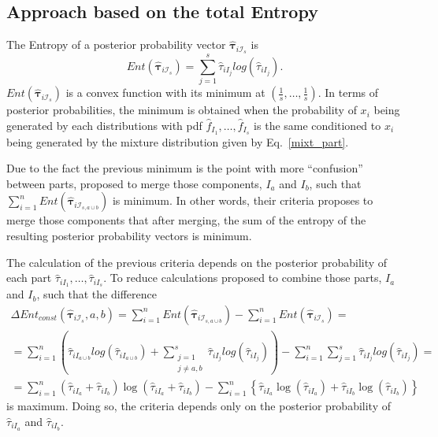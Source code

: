\documentclass[10pt, a4paper]{article}
\newcommand{\m}[1]{\boldsymbol{#1}}
\begin{document}
\subsection{Approach based on the total Entropy}

The Entropy of a posterior probability vector $\hat{\m \tau}_{i \mathcal{I}_s}$ is
\[
Ent( \hat{\m \tau}_{i \mathcal{I}_s} ) = \sum_{j=1}^s \hat{\tau}_{i I_j}  log(\hat{\tau}_{i I_j} ).
\]
$Ent( \hat{\m \tau}_{i \mathcal{I}_s} )$ is a convex function with its minimum at $(\frac{1}{s},\dots,\frac{1}{s})$. In terms of posterior probabilities, the minimum is obtained when the probability of $x_i$ being generated by each distributions with pdf $\hat{f}_{I_1}, \dots, \hat{f}_{I_s}$ is the same conditioned to $x_i$ being generated by the mixture distribution given by Eq.~\ref{mixt_part}.

Due to the fact the previous minimum is the point with more ``confusion'' between parts, \cite{baudry2010combining} proposed to merge those components, $I_a$ and $I_b$, such that $\sum_{i=1}^n Ent( \hat{\m \tau}_{i \mathcal{I}_{s, a \cup b}} )$ is minimum. In other words, their criteria proposes to merge those components that after merging, the sum of the entropy of the resulting posterior probability vectors is minimum.

The calculation of the previous criteria depends on the posterior probability of each part $\hat{\tau}_{iI_1}, \dots,\hat{\tau}_{iI_s}$. To reduce calculations \cite{baudry2010combining} proposed to combine those parts, $I_a$ and $I_b$, such that the difference 
\begin{multline*}
\Delta Ent_{const}(\hat{\m \tau}_{i \mathcal{I}_s}, a, b) = \sum_{i=1}^n Ent( \hat{\m \tau}_{i \mathcal{I}_{s, a \cup b}}) - \sum_{i=1}^n Ent( \hat{\m \tau}_{i \mathcal{I}_s}) =  \\ = \sum_{i=1}^n  \left( \hat{\tau}_{i I_{a\cup b}}  log(\hat{\tau}_{i I_{a\cup b}} ) +  \sum_{\substack{j=1 \\
                                                            j \neq a, b}}^s \hat{\tau}_{i I_j}  log(\hat{\tau}_{i I_j} ) \right)  - \sum_{i=1}^n \sum_{j=1}^s \hat{\tau}_{i I_j}  log(\hat{\tau}_{i I_j} ) = \\  =   \sum_{i=1}^n  (\hat{\tau}_{iI_a}+\hat{\tau}_{iI_b}) \log(\hat{\tau}_{iI_a} + \hat{\tau}_{iI_b}) - \sum_{i=1}^n \left\{ \hat{\tau}_{iI_a} \log(\hat{\tau}_{iI_a}) + \hat{\tau}_{iI_b} \log(\hat{\tau}_{iI_b})\right\}
\end{multline*}
is maximum. Doing so, the criteria depends only on the posterior probability of $\hat{\tau}_{iI_a}$ and $\hat{\tau}_{iI_b}$.
\end{document}
